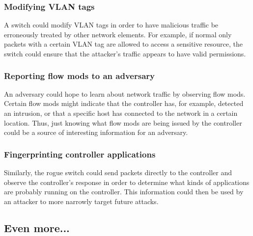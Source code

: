 \subsubsection{Modifying VLAN tags}
A switch could modify VLAN tags in order to have malicious traffic be erroneously treated by other network elements. For example, if normal only packets with a certain VLAN tag are allowed to access a sensitive resource, the switch could ensure that the attacker's traffic appears to have valid permissions. %

\subsubsection{Reporting flow mods to an adversary}
An adversary could hope to learn about network traffic by observing flow mods. Certain flow mods might indicate that the controller has, for example, detected an intrusion, or that a specific host has connected to the network in a certain location. Thus, just knowing what flow mods are being issued by the controller could be a source of interesting information for an adversary.

\subsubsection{Fingerprinting controller applications}
Similarly, the rogue switch could send packets directly to the controller and observe the controller's response in order to determine what kinds of applications are probably running on the controller. This information could then be used by an attacker to more narrowly target future attacks.

\subsection{Even more...}
